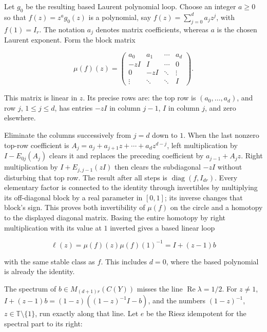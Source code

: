 Let \(g_0\) be the resulting based Laurent polynomial loop. Choose an integer \(a\geq0\) so that \(f(z)=z^ag_0(z)\) is a polynomial, say \(f(z)=\sum_{j=0}^d a_jz^j\), with \(f(1)=I_r\). The notation \(a_j\) denotes matrix coefficients, whereas \(a\) is the chosen Laurent exponent. Form the block matrix

\begin{equation}
\mu(f)(z)=
\begin{pmatrix}
a_0&a_1&\cdots&a_d\\
-zI&I&\cdots&0\\
0&-zI&\ddots&\vdots\\
\vdots&\ddots&\ddots&I
\end{pmatrix}.
\label{courseIII:almost-complex-structures-and-integrability:eq:10.3}
\end{equation}

This matrix is linear in \(z\). Its precise rows are: the top row is \((a_0,\ldots,a_d)\), and row \(j\), \(1\leq j\leq d\), has entries \(-zI\) in column \(j-1\), \(I\) in column \(j\), and zero elsewhere.

Eliminate the columns successively from \(j=d\) down to \(1\). When the last nonzero top-row coefficient is \(A_j=a_j+a_{j+1}z+\cdots+a_dz^{d-j}\), left multiplication by \(I-E_{0j}(A_j)\) clears it and replaces the preceding coefficient by \(a_{j-1}+A_jz\). Right multiplication by \(I+E_{j,j-1}(zI)\) then clears the subdiagonal \(-zI\) without disturbing that top row. The result after all steps is \(\operatorname{diag}(f,I_{dr})\). Every elementary factor is connected to the identity through invertibles by multiplying its off-diagonal block by a real parameter in \([0,1]\); its inverse changes that block's sign. This proves both invertibility of \(\mu(f)\) on the circle and a homotopy to the displayed diagonal matrix. Basing the entire homotopy by right multiplication with its value at \(1\) inverted gives a based linear loop

\begin{equation}
\ell(z)=\mu(f)(z)\mu(f)(1)^{-1}=I+(z-1)b
\label{courseIII:almost-complex-structures-and-integrability:eq:10.4}
\end{equation}

with the same stable class as \(f\). This includes \(d=0\), where the based polynomial is already the identity.

The spectrum of \(b\in M_{(d+1)r}(C(Y))\) misses the line \(\operatorname{Re}\lambda=1/2\). For \(z\ne1\),
\(I+(z-1)b=(1-z)((1-z)^{-1}I-b)\),
and the numbers \((1-z)^{-1}\), \(z\in\mathbb T\setminus\{1\}\), run exactly along that line. Let \(e\) be the Riesz idempotent for the spectral part to its right:

